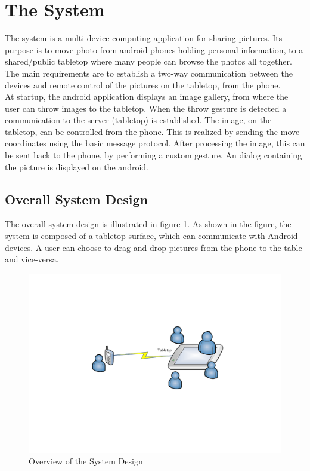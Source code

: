 \section{The System}
\label{sec.thesystem}
The system is a multi-device computing application for sharing
pictures. Its purpose is to move photo from android phones holding personal
information, to a shared/public tabletop where many  people can browse the
photos all together. \\

The main requirements are to establish a two-way communication between the
devices and remote control of the pictures on the tabletop, from the
phone. \\

At startup, the android application displays an image gallery,
from where the user can throw images to the tabletop. When the throw gesture is
detected a communication to the server (tabletop) is established. The image, on
the tabletop, can be controlled from the phone. This is realized by sending the
move coordinates using the basic message protocol. After processing the image,
this can be sent back to the phone, by performing a custom gesture. An dialog
containing the picture is displayed on the android.

\subsection{Overall System Design}
\label{sec.thesystem.design}

The overall system design is illustrated in figure \ref{fig.system_overview}.
As shown in the figure, the system is composed of a tabletop surface, which can
communicate with Android devices. A user can choose to drag and drop pictures
from the phone to the table and vice-versa.

 \begin{figure}[H]
    \begin{center}
        \includegraphics[width=\textwidth]{fig/system_overview.pdf}
        \caption{Overview of the System Design}
        \label{fig.system_overview}
    \end{center}
\end{figure}

